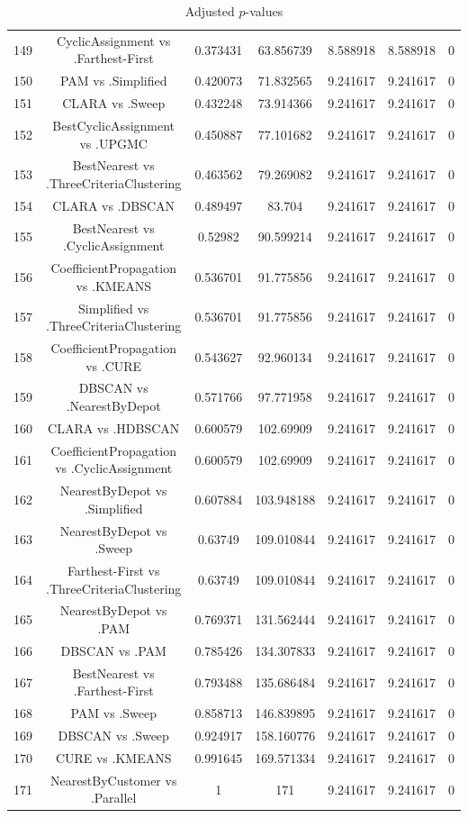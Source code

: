 \documentclass[a4paper,10pt]{article}
\begin{document}
\begin{landscape}
\begin{table}[!htp]
\begin{tabular}{ccccccc}
149&CyclicAssignment vs .Farthest-First&0.373431&63.856739&8.588918&8.588918&0\\
150&PAM vs .Simplified&0.420073&71.832565&9.241617&9.241617&0\\
151&CLARA vs .Sweep&0.432248&73.914366&9.241617&9.241617&0\\
152&BestCyclicAssignment vs .UPGMC&0.450887&77.101682&9.241617&9.241617&0\\
153&BestNearest vs .ThreeCriteriaClustering&0.463562&79.269082&9.241617&9.241617&0\\
154&CLARA vs .DBSCAN&0.489497&83.704&9.241617&9.241617&0\\
155&BestNearest vs .CyclicAssignment&0.52982&90.599214&9.241617&9.241617&0\\
156&CoefficientPropagation vs .KMEANS&0.536701&91.775856&9.241617&9.241617&0\\
157&Simplified vs .ThreeCriteriaClustering&0.536701&91.775856&9.241617&9.241617&0\\
158&CoefficientPropagation vs .CURE&0.543627&92.960134&9.241617&9.241617&0\\
159&DBSCAN vs .NearestByDepot&0.571766&97.771958&9.241617&9.241617&0\\
160&CLARA vs .HDBSCAN&0.600579&102.69909&9.241617&9.241617&0\\
161&CoefficientPropagation vs .CyclicAssignment&0.600579&102.69909&9.241617&9.241617&0\\
162&NearestByDepot vs .Simplified&0.607884&103.948188&9.241617&9.241617&0\\
163&NearestByDepot vs .Sweep&0.63749&109.010844&9.241617&9.241617&0\\
164&Farthest-First vs .ThreeCriteriaClustering&0.63749&109.010844&9.241617&9.241617&0\\
165&NearestByDepot vs .PAM&0.769371&131.562444&9.241617&9.241617&0\\
166&DBSCAN vs .PAM&0.785426&134.307833&9.241617&9.241617&0\\
167&BestNearest vs .Farthest-First&0.793488&135.686484&9.241617&9.241617&0\\
168&PAM vs .Sweep&0.858713&146.839895&9.241617&9.241617&0\\
169&DBSCAN vs .Sweep&0.924917&158.160776&9.241617&9.241617&0\\
170&CURE vs .KMEANS&0.991645&169.571334&9.241617&9.241617&0\\
171&NearestByCustomer vs .Parallel&1&171&9.241617&9.241617&0\\
\hline
\end{tabular}
\caption{Adjusted $p$-values}
\end{table}

\end{landscape}
\end{document}
